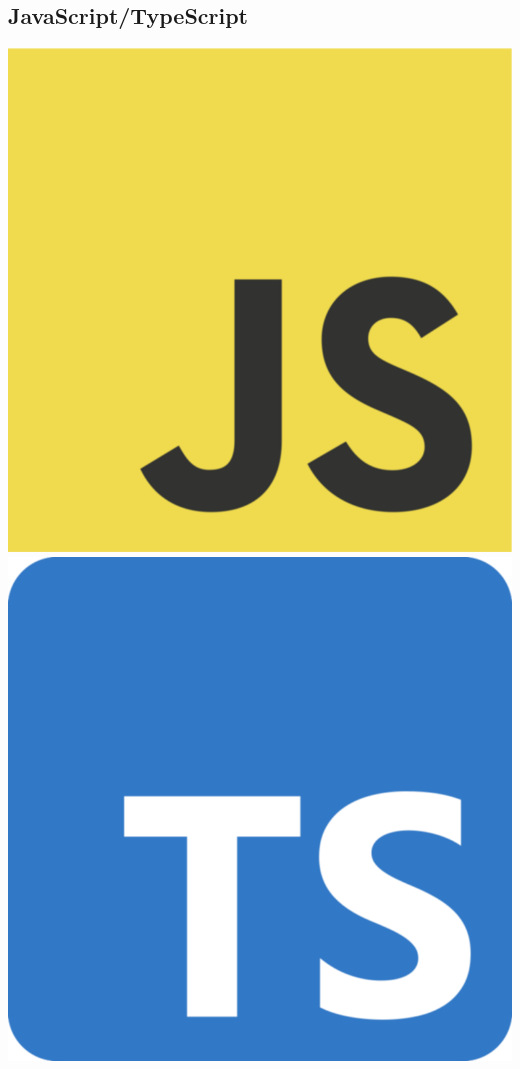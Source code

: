 \subsection{JavaScript/TypeScript}\label{subsec:javascript/typescript}
\includegraphics[scale=0.05]{assets/javascript}
\includegraphics[scale=0.05]{assets/typescript}

